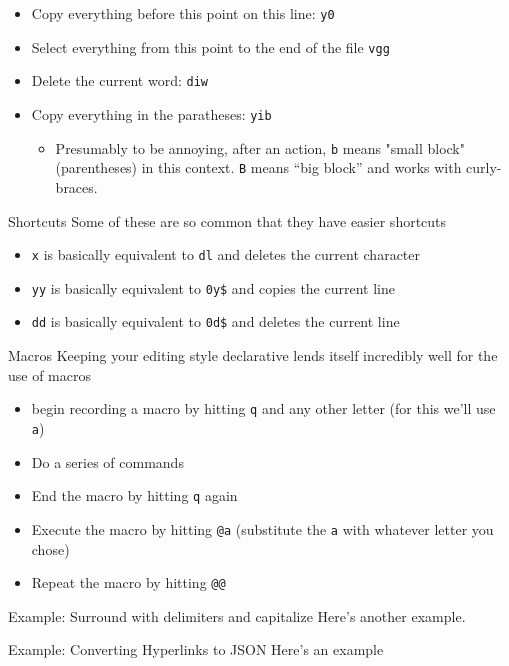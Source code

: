 \documentclass{beamer}
\begin{document}
\begin{frame}
	\begin{itemize}	
		\item Copy everything before this point on this line: \texttt{y0}
		\item Select everything from this point to the end of the file \texttt{vgg}
		\item Delete the current word: \texttt{diw}
		\item Copy everything in the paratheses: \texttt{yib} \begin {itemize}
		\item Presumably to be annoying, after an action, \texttt{b} means "small block" (parentheses) in this context. \texttt{B} means ``big block'' and works with curly-braces. 
	        \end{itemize}
	\end{itemize}
	\end{frame}
\begin{frame}{Shortcuts}
  Some of these are so common that they have easier shortcuts
  \begin{itemize}
	  \item \texttt{x} is basically equivalent to \texttt{dl} and deletes the current character
	  \item \texttt{yy} is basically equivalent to \texttt{0y\$} and copies the current line
	  \item \texttt{dd} is basically equivalent to \texttt{0d\$} and deletes the current line
  \end{itemize}
\end{frame}
\begin{frame}{Macros}
   Keeping your editing style declarative lends itself incredibly well for the use of macros
   \begin{itemize}
	   \item begin recording a macro by hitting \texttt{q} and any other letter (for this we'll use \texttt{a})
           \item Do a series of commands 
	   \item End the macro by hitting \texttt{q} again
	   \item Execute the macro by hitting \texttt{@a} (substitute the \texttt{a} with whatever letter you chose)
	   \item Repeat the macro by hitting \texttt{@@}
   \end{itemize}
\end{frame}
\begin{frame}{Example: Surround with delimiters and capitalize}
	Here's another example.
\end{frame}
\begin{frame}{Example: Converting Hyperlinks to JSON}
	Here's an example 
\end{frame}
\end{document}
